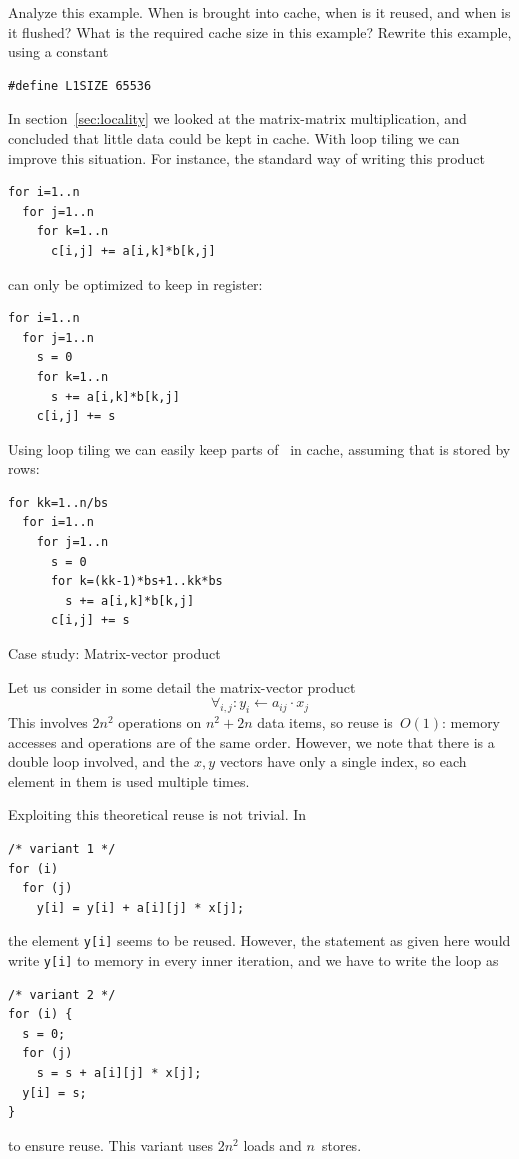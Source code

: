 \begin{exercise}
  Analyze this example. When is  brought into cache, when is it
  reused, and when is it flushed? What is the required cache size in
  this example? Rewrite this example, using a constant
\begin{verbatim}
#define L1SIZE 65536
\end{verbatim}
\end{exercise}

In section~\ref{sec:locality} we looked at the matrix-matrix
multiplication, and concluded that little data could be kept in
cache. With loop tiling we can improve this situation. For instance,
the standard way of writing this product
\begin{verbatim}
for i=1..n
  for j=1..n
    for k=1..n
      c[i,j] += a[i,k]*b[k,j]
\end{verbatim}
can only be optimized to keep  in register:
\begin{verbatim}
for i=1..n
  for j=1..n
    s = 0
    for k=1..n
      s += a[i,k]*b[k,j]
    c[i,j] += s
\end{verbatim}
Using loop tiling we can easily keep parts of~ in cache,
assuming that  is stored by rows:
\begin{verbatim}
for kk=1..n/bs
  for i=1..n
    for j=1..n
      s = 0
      for k=(kk-1)*bs+1..kk*bs
        s += a[i,k]*b[k,j]
      c[i,j] += s
\end{verbatim}


 {Case study: Matrix-vector product}
\label{sec:mvp-opt}

Let us consider in some detail
the matrix-vector product
\[ \forall_{i,j}\colon y_i\leftarrow a_{ij}\cdot x_j \] This involves $2n^2$
operations on $n^2+2n$ data items, so reuse is~$O(1)$: memory accesses
and operations are of the same order. However, we note that there is a
double loop involved, and the $x,y$ vectors have only a single index,
so each element in them is used multiple times.

Exploiting this theoretical reuse is not trivial. In
\begin{verbatim}
/* variant 1 */
for (i)
  for (j)
    y[i] = y[i] + a[i][j] * x[j];
\end{verbatim}
the element \texttt{y[i]} seems to be reused. However, the statement
as given here would write \texttt{y[i]} to memory in every inner
iteration, and we have to write the loop as
\begin{verbatim}
/* variant 2 */
for (i) {
  s = 0;
  for (j)
    s = s + a[i][j] * x[j];
  y[i] = s;
}
\end{verbatim}
to ensure reuse. This variant uses $2n^2$ loads and $n$~stores.

